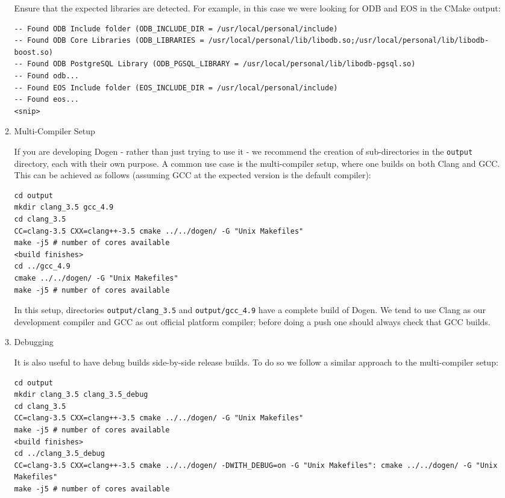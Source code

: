 \documentclass[11pt]{article}
\begin{document}
\begin{enumerate}
\begin{enumerate}
Ensure that the expected libraries are detected. For example, in this
case we were looking for ODB and EOS in the CMake output:

\begin{verbatim}
-- Found ODB Include folder (ODB_INCLUDE_DIR = /usr/local/personal/include)
-- Found ODB Core Libraries (ODB_LIBRARIES = /usr/local/personal/lib/libodb.so;/usr/local/personal/lib/libodb-boost.so)
-- Found ODB PostgreSQL Library (ODB_PGSQL_LIBRARY = /usr/local/personal/lib/libodb-pgsql.so)
-- Found odb...
-- Found EOS Include folder (EOS_INCLUDE_DIR = /usr/local/personal/include)
-- Found eos...
<snip>
\end{verbatim}

\item Multi-Compiler Setup
\label{sec-3-1-2-4-2}

If you are developing Dogen - rather than just trying to use it - we
recommend the creation of sub-directories in the \texttt{output} directory,
each with their own purpose. A common use case is the multi-compiler
setup, where one builds on both Clang and GCC. This can be achieved as
follows (assuming GCC at the expected version is the default
compiler):

\begin{verbatim}
cd output
mkdir clang_3.5 gcc_4.9
cd clang_3.5
CC=clang-3.5 CXX=clang++-3.5 cmake ../../dogen/ -G "Unix Makefiles"
make -j5 # number of cores available
<build finishes>
cd ../gcc_4.9
cmake ../../dogen/ -G "Unix Makefiles"
make -j5 # number of cores available
\end{verbatim}

In this setup, directories \texttt{output/clang\_3.5} and \texttt{output/gcc\_4.9}
have a complete build of Dogen. We tend to use Clang as our
development compiler and GCC as out official platform compiler; before
doing a push one should always check that GCC builds.

\item Debugging
\label{sec-3-1-2-4-3}

It is also useful to have debug builds side-by-side release builds. To
do so we follow a similar approach to the multi-compiler setup:

\begin{verbatim}
cd output
mkdir clang_3.5 clang_3.5_debug
cd clang_3.5
CC=clang-3.5 CXX=clang++-3.5 cmake ../../dogen/ -G "Unix Makefiles"
make -j5 # number of cores available
<build finishes>
cd ../clang_3.5_debug
CC=clang-3.5 CXX=clang++-3.5 cmake ../../dogen/ -DWITH_DEBUG=on -G "Unix Makefiles": cmake ../../dogen/ -G "Unix Makefiles"
make -j5 # number of cores available
\end{verbatim}


\end{enumerate}
\end{enumerate}
\end{document}
